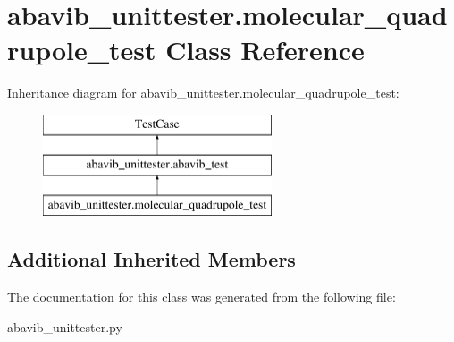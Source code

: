 \hypertarget{classabavib__unittester_1_1molecular__quadrupole__test}{\section{abavib\+\_\+unittester.\+molecular\+\_\+quadrupole\+\_\+test Class Reference}
\label{classabavib__unittester_1_1molecular__quadrupole__test}
}
Inheritance diagram for abavib\+\_\+unittester.\+molecular\+\_\+quadrupole\+\_\+test\+:\begin{figure}[H]
\begin{center}
\leavevmode
\includegraphics[height=3.000000cm]{classabavib__unittester_1_1molecular__quadrupole__test}
\end{center}
\end{figure}
\subsection*{Additional Inherited Members}


The documentation for this class was generated from the following file\+:\begin{DoxyCompactItemize}
\item 
abavib\+\_\+unittester.\+py\end{DoxyCompactItemize}
